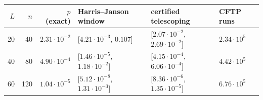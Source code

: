 \begin{tabular}{rrrlll}
\toprule
$L$ & $n$ & $p$ (exact) & Harris--Janson window & certified telescoping & CFTP runs\\
\midrule
20 & 40 & $2.31\cdot10^{-2}$ & [$4.21\cdot10^{-3}$, $0.107$] & [$2.07\cdot10^{-2}$, $2.69\cdot10^{-2}$] & $2.34\cdot10^{5}$\\
40 & 80 & $4.90\cdot10^{-4}$ & [$1.46\cdot10^{-5}$, $1.18\cdot10^{-2}$] & [$4.15\cdot10^{-4}$, $6.06\cdot10^{-4}$] & $4.42\cdot10^{5}$\\
60 & 120 & $1.04\cdot10^{-5}$ & [$5.12\cdot10^{-8}$, $1.31\cdot10^{-3}$] & [$8.36\cdot10^{-6}$, $1.35\cdot10^{-5}$] & $6.76\cdot10^{5}$\\
\bottomrule
\end{tabular}
